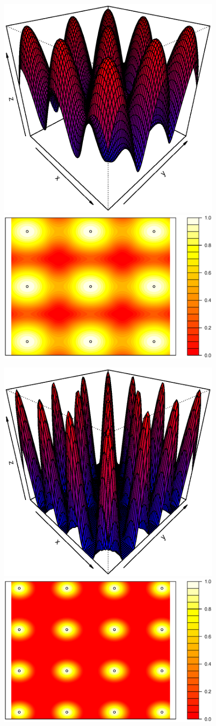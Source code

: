 \documentclass[11pt]{article}
\begin{document}
\begin{figure}[!ht]
\centering
\includegraphics[width=0.55\columnwidth]{./Images/res2}
\includegraphics[width=0.44\columnwidth]{./Images/res21}
\caption{}
\label{fig:res2}
\end{figure}

\begin{figure}[!ht]
\centering
\includegraphics[width=0.55\columnwidth]{./Images/res3}
\includegraphics[width=0.44\columnwidth]{./Images/res31}
\caption{}
\label{fig:res3}
\end{figure}
\end{document}
